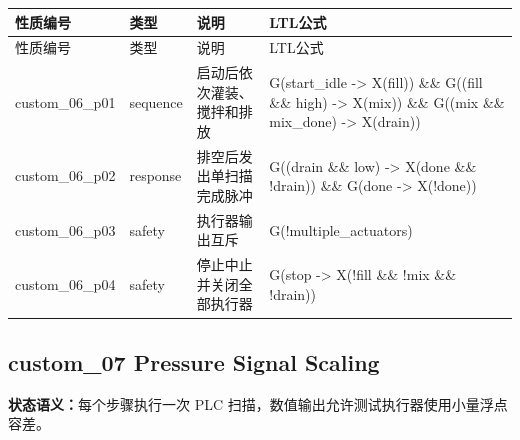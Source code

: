 \begin{longtable}{L{2.3cm}L{1.7cm}L{4.1cm}L{5.2cm}}

\toprule

性质编号 & 类型 & 说明 & LTL公式\\

\midrule

\endfirsthead

\toprule

性质编号 & 类型 & 说明 & LTL公式\\

\midrule

\endhead

{\ttfamily custom\_06\_p01} & sequence & 启动后依次灌装、搅拌和排放 & {\ttfamily G(start\_idle -> X(fill)) \&\& G((fill \&\& high) -> X(mix)) \&\& G((mix \&\& mix\_done) -> X(drain))}\\

{\ttfamily custom\_06\_p02} & response & 排空后发出单扫描完成脉冲 & {\ttfamily G((drain \&\& low) -> X(done \&\& !drain)) \&\& G(done -> X(!done))}\\

{\ttfamily custom\_06\_p03} & safety & 执行器输出互斥 & {\ttfamily G(!multiple\_actuators)}\\

{\ttfamily custom\_06\_p04} & safety & 停止中止并关闭全部执行器 & {\ttfamily G(stop -> X(!fill \&\& !mix \&\& !drain))}\\

\bottomrule

\end{longtable}

\subsection{{\ttfamily custom\_07} Pressure Signal Scaling}

\noindent\textbf{状态语义：}每个步骤执行一次 PLC 扫描，数值输出允许测试执行器使用小量浮点容差。

